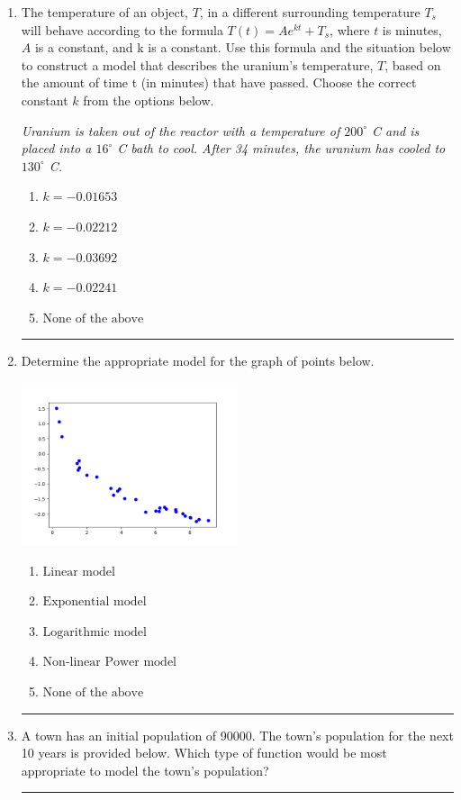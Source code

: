 \documentclass[14pt]{extbook}
\newcommand{\litem}[1]{\item#1\hspace*{-1cm}\rule{\textwidth}{0.4pt}}
\begin{document}
\begin{enumerate}
{\begin{enumerate}[label=\Alph*.]
\end{enumerate} }
\litem{
The temperature of an object, $T$, in a different surrounding temperature $T_s$ will behave according to the formula $T(t) = Ae^{kt} + T_s$, where $t$ is minutes, $A$ is a constant, and k is a constant. Use this formula and the situation below to construct a model that describes the uranium's temperature, $T$, based on the amount of time t (in minutes) that have passed. Choose the correct constant $k$ from the options below.
\begin{center}
    \textit{ Uranium is taken out of the reactor with a temperature of $200^{\circ}$ C and is placed into a $16^{\circ}$ C bath to cool. After 34 minutes, the uranium has cooled to $130^{\circ}$ C. }
\end{center}
\begin{enumerate}[label=\Alph*.]
\item \( k = -0.01653 \)
\item \( k = -0.02212 \)
\item \( k = -0.03692 \)
\item \( k = -0.02241 \)
\item \( \text{None of the above} \)

\end{enumerate} }
\litem{
Determine the appropriate model for the graph of points below.
\begin{center}
    \includegraphics[width=0.5\textwidth]{../Figures/identifyModelGraph11A.png}
\end{center}
\begin{enumerate}[label=\Alph*.]
\item \( \text{Linear model} \)
\item \( \text{Exponential model} \)
\item \( \text{Logarithmic model} \)
\item \( \text{Non-linear Power model} \)
\item \( \text{None of the above} \)

\end{enumerate} }
\litem{
A town has an initial population of 90000. The town's population for the next 10 years is provided below. Which type of function would be most appropriate to model the town's population?

}
\end{enumerate}
\end{document}
